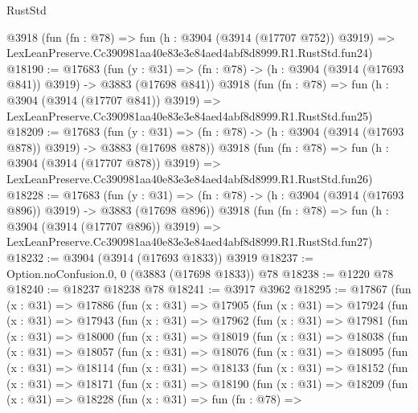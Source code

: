 \begin{lexlean}{RustStd}
\begin{coremodule}
    @3918
    (fun (fn : @78) =>
    fun (h : @3904 (@3914 (@17707 @752)) @3919) =>
    LexLeanPreserve.Cc390981aa40e83e3e84aed4abf8d8999.R1.RustStd.fun24)
@18190 := @17683
    (fun (y : @31) => (fn : @78) -> (h : @3904 (@3914 (@17693 @841)) @3919) -> @3883 (@17698 @841))
    @3918
    (fun (fn : @78) =>
    fun (h : @3904 (@3914 (@17707 @841)) @3919) =>
    LexLeanPreserve.Cc390981aa40e83e3e84aed4abf8d8999.R1.RustStd.fun25)
@18209 := @17683
    (fun (y : @31) => (fn : @78) -> (h : @3904 (@3914 (@17693 @878)) @3919) -> @3883 (@17698 @878))
    @3918
    (fun (fn : @78) =>
    fun (h : @3904 (@3914 (@17707 @878)) @3919) =>
    LexLeanPreserve.Cc390981aa40e83e3e84aed4abf8d8999.R1.RustStd.fun26)
@18228 := @17683
    (fun (y : @31) => (fn : @78) -> (h : @3904 (@3914 (@17693 @896)) @3919) -> @3883 (@17698 @896))
    @3918
    (fun (fn : @78) =>
    fun (h : @3904 (@3914 (@17707 @896)) @3919) =>
    LexLeanPreserve.Cc390981aa40e83e3e84aed4abf8d8999.R1.RustStd.fun27)
@18232 := @3904 (@3914 (@17693 @1833)) @3919
@18237 := Option.noConfusion.{0, 0} (@3883 (@17698 @1833)) @78
@18238 := @1220 @78
@18240 := @18237 @18238 @78
@18241 := @3917 @3962
@18295 := @17867
    (fun (x : @31) =>
    @17886
      (fun (x : @31) =>
      @17905
        (fun (x : @31) =>
        @17924
          (fun (x : @31) =>
          @17943
            (fun (x : @31) =>
            @17962
              (fun (x : @31) =>
              @17981
                (fun (x : @31) =>
                @18000
                  (fun (x : @31) =>
                  @18019
                    (fun (x : @31) =>
                    @18038
                      (fun (x : @31) =>
                      @18057
                        (fun (x : @31) =>
                        @18076
                          (fun (x : @31) =>
                          @18095
                            (fun (x : @31) =>
                            @18114
                              (fun (x : @31) =>
                              @18133
                                (fun (x : @31) =>
                                @18152
                                  (fun (x : @31) =>
                                  @18171
                                    (fun (x : @31) =>
                                    @18190
                                      (fun (x : @31) =>
                                      @18209
                                        (fun (x : @31) =>
                                        @18228
                                          (fun (x : @31) =>
                                          fun (fn : @78) =>

\end{coremodule}
\end{lexlean}
